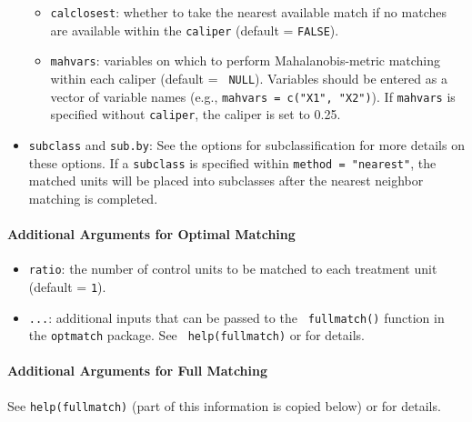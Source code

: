 \begin{itemize}
\begin{itemize}
  \item \texttt{calclosest}: whether to take the nearest available
    match if no matches are available within the \texttt{caliper}
    (default = {\tt FALSE}).
  \item \texttt{mahvars}: variables on which to perform
    Mahalanobis-metric matching within each caliper (default = {\tt
      NULL}).  Variables should be entered as a vector of variable
    names (e.g., \texttt{mahvars = c("X1", "X2")}).  If
    \texttt{mahvars} is specified without \texttt{caliper}, the
    caliper is set to 0.25.
  \end{itemize}
\item \texttt{subclass} and \texttt{sub.by}: See the options for
  subclassification for more details on these options.  If a
  \texttt{subclass} is specified within \texttt{method = "nearest"},
  the matched units will be placed into subclasses after the nearest
  neighbor matching is completed.
\end{itemize}

\paragraph{Additional Arguments for Optimal Matching}
\label{subsubsec:inputs-optimal}

\begin{itemize}
\item {\tt ratio}: the number of control units to be matched to each
  treatment unit (default = {\tt 1}).
\item {\tt ...}: additional inputs that can be passed to the {\tt
    fullmatch()} function in the {\tt optmatch} package. See {\tt
    help(fullmatch)} or
  for details.
\end{itemize}

\paragraph{Additional Arguments for Full Matching}
\label{subsubsec:inputs-full}

See {\tt help(fullmatch)} (part of this information is copied below)
or
for details.


